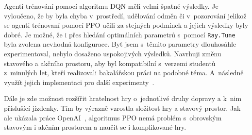 Agenti trénování pomocí algoritmu DQN měli velmi špatné výsledky.
Je vyloučeno, že by byla chyba v~prostředí, udělování odměn či v~pozorování jelikož se agenti trénovaní pomocí PPO učili za stejných podmínek a jejich výsledky byly dobré.
Je možné, že i přes hledání optimálních parametrů s~pomocí \texttt{Ray.Tune} byla zvolena nevhodná konfigurace.
Byť jsem s~těmito parametry dlouhosáhle experimentoval, nebylo dosaženo uspokojivých výsledků.
Navrhuji změnu stavového a akčního prostoru, aby byl kompatibilní s~verzemi studentů z~minulých let, kteří realizovali bakalářskou práci na podobné téma.
A~následně využít jejich implementaci pro další experimenty~\cite{Hrklova2023thesis}.

Dále je zde možnost rozšířit hratelnost hry o~jednotlivé druhy dopravy a k~nim příslušící jízdenky.
Tím by výrazně vzrostla složitost hry a stavový prostor.
Jak ale ukázala práce OpenAI~\cite{Dota2}, algoritmus PPO nemá problém s~obrovským stavovým i akčním prostorem a naučit se i komplikované hry.




%
